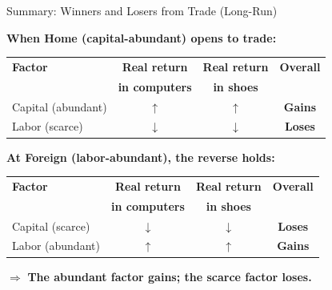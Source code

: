 \documentclass{beamer}
\begin{document}
\begin{frame}{Summary: Winners and Losers from Trade (Long-Run)}

\textbf{When Home (capital-abundant) opens to trade:}

\vspace{0.3cm}

\begin{center}
\begin{tabular}{lccc}
\toprule
\textbf{Factor} & \textbf{Real return} & \textbf{Real return} & \textbf{Overall} \\
& \textbf{in computers} & \textbf{in shoes} & \\
\midrule
\textcolor{capitalcolor}{Capital (abundant)} & $\uparrow$ & $\uparrow$ & \textcolor{capitalcolor}{\textbf{Gains}} \\
\textcolor{foreigncolor}{Labor (scarce)} & $\downarrow$ & $\downarrow$ & \textcolor{foreigncolor}{\textbf{Loses}} \\
\bottomrule
\end{tabular}
\end{center}

\vspace{0.3cm}

\textbf{At Foreign (labor-abundant), the reverse holds:}

\begin{center}
\begin{tabular}{lccc}
\toprule
\textbf{Factor} & \textbf{Real return} & \textbf{Real return} & \textbf{Overall} \\
& \textbf{in computers} & \textbf{in shoes} & \\
\midrule
\textcolor{foreigncolor}{Capital (scarce)} & $\downarrow$ & $\downarrow$ & \textcolor{foreigncolor}{\textbf{Loses}} \\
\textcolor{capitalcolor}{Labor (abundant)} & $\uparrow$ & $\uparrow$ & \textcolor{capitalcolor}{\textbf{Gains}} \\
\bottomrule
\end{tabular}
\end{center}

\vspace{0.2cm}

$\Rightarrow$ \textbf{The abundant factor gains; the scarce factor loses.}

\end{frame}
\end{document}
